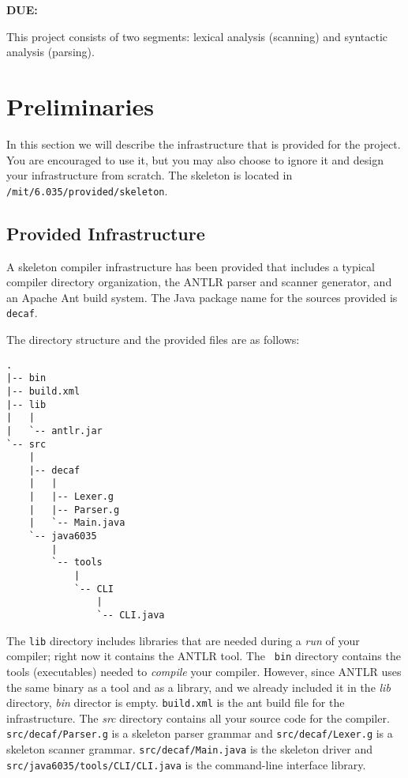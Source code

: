 



{\bf DUE: \PARSERDUE}

This project consists of two segments: lexical analysis (scanning) and
syntactic analysis (parsing).

\section*{Preliminaries}
In this section we will describe the infrastructure that is provided
for the project.  You are encouraged to use it, but you may also
choose to ignore it and design your infrastructure from scratch.  The
skeleton is located in {\tt /mit/6.035/provided/skeleton}.

\subsection*{Provided Infrastructure}
A skeleton compiler infrastructure has been provided that includes a
typical compiler directory organization, the ANTLR parser and
scanner generator, and an Apache Ant build system. The Java package
name for the sources provided is {\tt decaf}.

The directory structure and the provided files are as follows:

{\scriptsize
\begin{verbatim}
.
|-- bin
|-- build.xml
|-- lib
|   |
|   `-- antlr.jar
`-- src
    |
    |-- decaf
    |   |
    |   |-- Lexer.g
    |   |-- Parser.g
    |   `-- Main.java
    `-- java6035
        |
        `-- tools
            |
            `-- CLI
                |
                `-- CLI.java
\end{verbatim}
}

The {\tt lib} directory includes libraries that are needed during a {\it
run} of your compiler; right now it contains the ANTLR tool. The {\tt
bin} directory contains the tools (executables) needed to {\it compile} your
compiler. However, since ANTLR uses the same binary as a tool and as
a library, and we already included it in the {\it lib} directory,
{\it bin} director is empty. {\tt build.xml} is the ant build file
for the infrastructure. The {\it src} directory contains all your
source code for the compiler. {\tt src/decaf/Parser.g} is a skeleton
parser grammar and {\tt src/decaf/Lexer.g} is a skeleton scanner
grammar. {\tt src/decaf/Main.java} is the skeleton driver and {\tt
src/java6035/tools/CLI/CLI.java} is the command-line interface
library.

